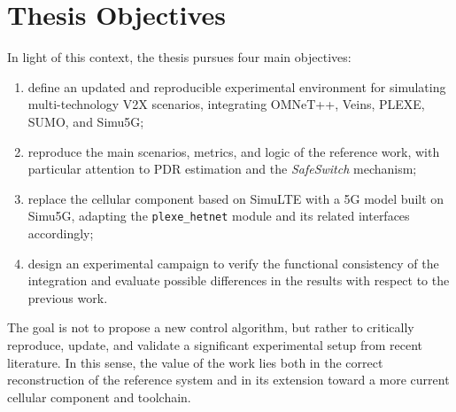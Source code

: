 \section{Thesis Objectives}

In light of this context, the thesis pursues four main objectives:
\begin{enumerate}
\item define an updated and reproducible experimental environment for simulating multi-technology V2X scenarios, integrating OMNeT++, Veins, PLEXE, SUMO, and Simu5G;
\item reproduce the main scenarios, metrics, and logic of the reference work, with particular attention to PDR estimation and the \emph{SafeSwitch} mechanism;
\item replace the cellular component based on SimuLTE with a 5G model built on Simu5G, adapting the \texttt{plexe\_hetnet} module and its related interfaces accordingly;
\item design an experimental campaign to verify the functional consistency of the integration and evaluate possible differences in the results with respect to the previous work.
\end{enumerate}

The goal is not to propose a new control algorithm, but rather to critically reproduce, update, and validate a significant experimental setup from recent literature. In this sense, the value of the work lies both in the correct reconstruction of the reference system and in its extension toward a more current cellular component and toolchain.
